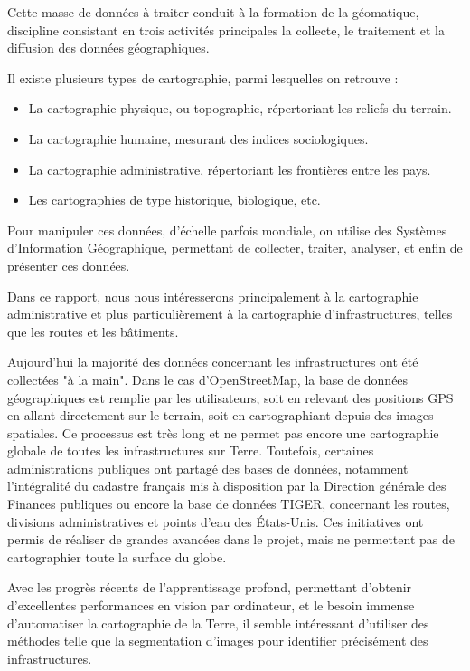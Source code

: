 \documentclass[a4paper, 11pt]{report}
\begin{document}
Cette masse de données à traiter conduit à la formation de la géomatique, discipline consistant en trois activités principales la collecte, le traitement et la diffusion des données géographiques.

Il existe plusieurs types de cartographie, parmi lesquelles on retrouve :
\begin{itemize}
	\item La cartographie physique, ou topographie, répertoriant les reliefs du terrain.
	\item La cartographie humaine, mesurant des indices sociologiques.
	\item La cartographie administrative, répertoriant les frontières entre les pays.
	\item Les cartographies de type historique, biologique, etc.
\end{itemize}

Pour manipuler ces données, d'échelle parfois mondiale, on utilise des Systèmes d'Information Géographique, permettant de collecter, traiter, analyser, et enfin de présenter ces données.

Dans ce rapport, nous nous intéresserons principalement à la cartographie administrative et plus particulièrement à la cartographie d'infrastructures, telles que les routes et les bâtiments.

Aujourd'hui la majorité des données concernant les infrastructures ont été collectées "à la main".
Dans le cas d'OpenStreetMap, la base de données géographiques est remplie par les utilisateurs, soit en relevant des positions GPS en allant directement sur le terrain, soit en cartographiant depuis des images spatiales.
Ce processus est très long et ne permet pas encore une cartographie globale de toutes les infrastructures sur Terre.
Toutefois, certaines administrations publiques ont partagé des bases de données, notamment l'intégralité du cadastre français mis à disposition par la Direction générale des Finances publiques ou encore la base de données TIGER, concernant les routes, divisions administratives et points d'eau des États-Unis.
Ces initiatives ont permis de réaliser de grandes avancées dans le projet, mais ne permettent pas de cartographier toute la surface du globe.


Avec les progrès récents de l'apprentissage profond, permettant d'obtenir d'excellentes performances en vision par ordinateur, et le besoin immense d'automatiser la cartographie de la Terre, il semble intéressant d'utiliser des méthodes telle que la segmentation d'images pour identifier précisément des infrastructures.
\end{document}

